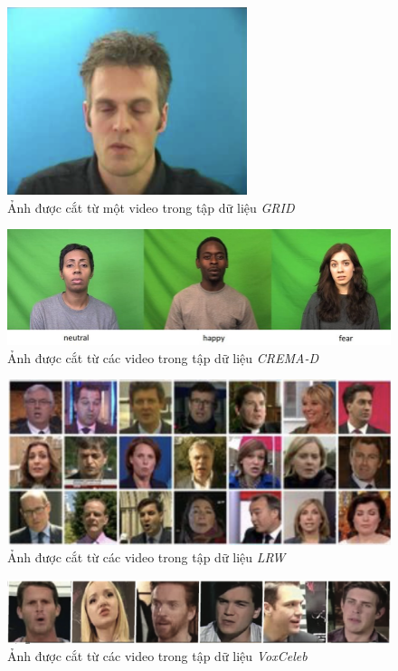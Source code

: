 \begin{figure}[H]
    \centering
    \includegraphics[width=7cm]{./content/images/grid_img.png}
    \caption{Ảnh được cắt từ một video trong tập dữ liệu \textit{GRID}}
\end{figure}

\begin{figure}[H]
    \centering
    \includegraphics[width=15cm]{./content/images/crema-d_img.jpg}
    \caption{Ảnh được cắt từ các video trong tập dữ liệu \textit{CREMA-D}}
\end{figure}

\begin{figure}[H]
    \centering
    \includegraphics[width=15cm]{./content/images/lrw_img.png}
    \caption{Ảnh được cắt từ các video trong tập dữ liệu \textit{LRW}}
\end{figure}

\begin{figure}[H]
    \centering
    \includegraphics[width=15cm]{./content/images/vox_img.png}
    \caption{Ảnh được cắt từ các video trong tập dữ liệu \textit{VoxCeleb}}
\end{figure}

